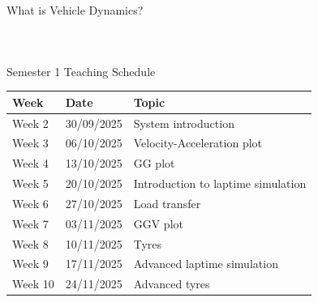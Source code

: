 \begin{frame}{What is Vehicle Dynamics?}
\begin{columns}
\begin{figure}
        \end{figure}
    \end{columns}
\end{frame}

\begin{frame}{Semester 1 Teaching Schedule}
    \begin{table}
        \renewcommand{\arraystretch}{1.5}
        \begin{tabular}{l l l}
            \textbf{Week} & \textbf{Date} & \textbf{Topic} \\
            \hline
            Week 2 & 30/09/2025 & System introduction \\
            Week 3 & 06/10/2025 & Velocity-Acceleration plot \\
            Week 4 & 13/10/2025 & GG plot \\
            Week 5 & 20/10/2025 & Introduction to laptime simulation \\
            Week 6 & 27/10/2025 & Load transfer \\
            Week 7 & 03/11/2025 & GGV plot \\
            Week 8 & 10/11/2025 & Tyres \\
            Week 9 & 17/11/2025 & Advanced laptime simulation \\
            Week 10& 24/11/2025 & Advanced tyres
        \end{tabular}
    \end{table}
\end{frame}